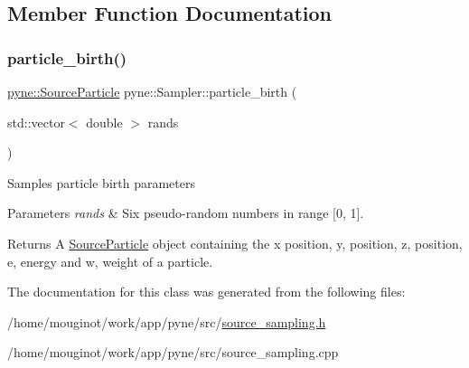 \subsection{Member Function Documentation}
\mbox{\label{classpyne_1_1_sampler_a2e5d98ef0f98a3093c32936ce6cc8cd2}} 
\subsubsection{\texorpdfstring{particle\+\_\+birth()}{particle\_birth()}}
{\footnotesize\ttfamily \hyperlink{classpyne_1_1_source_particle}{pyne\+::\+Source\+Particle} pyne\+::\+Sampler\+::particle\+\_\+birth (\begin{DoxyParamCaption}\item[{std\+::vector$<$ double $>$}]{rands }\end{DoxyParamCaption})}

Samples particle birth parameters 
\begin{DoxyParams}{Parameters}
{\em rands} & Six pseudo-\/random numbers in range \mbox{[}0, 1\mbox{]}. \\
\hline
\end{DoxyParams}
\begin{DoxyReturn}{Returns}
A \hyperlink{classpyne_1_1_source_particle}{Source\+Particle} object containing the x position, y, position, z, position, e, energy and w, weight of a particle. 
\end{DoxyReturn}


The documentation for this class was generated from the following files\+:\begin{DoxyCompactItemize}
\item 
/home/mouginot/work/app/pyne/src/\hyperlink{source__sampling_8h}{source\+\_\+sampling.\+h}\item 
/home/mouginot/work/app/pyne/src/source\+\_\+sampling.\+cpp\end{DoxyCompactItemize}
